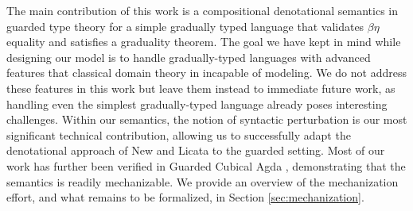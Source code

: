 The main contribution of this work is a compositional denotational semantics in
guarded type theory for a simple gradually typed language that validates
$\beta\eta$ equality and satisfies a graduality theorem.
%
The goal we have kept in mind while designing our model is to handle
gradually-typed languages with advanced features that classical domain theory in
incapable of modeling. We do not address these features in this work but leave
them instead to immediate future work, as handling even the simplest
gradually-typed language already poses interesting challenges.
%
Within our semantics, the notion of syntactic perturbation is our most
significant technical contribution, allowing us to successfully adapt the
denotational approach of New and Licata to the guarded setting.
%
Most of our work has further been verified in Guarded Cubical Agda
\cite{veltri-vezzosi2020}, demonstrating that the semantics is readily
mechanizable. We provide an overview of the mechanization effort, and what
remains to be formalized, in Section \ref{sec:mechanization}.
%


%


